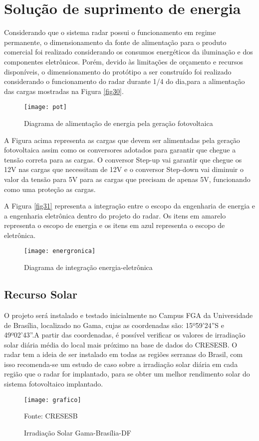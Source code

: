 

\chapter{Solução de suprimento de energia}
Considerando que o sistema radar possui o funcionamento em regime permanente, o dimensionamento da fonte de alimentação para o produto comercial foi realizado considerando os consumos energéticos da iluminação e dos componentes eletrônicos. Porém, devido às limitações de orçamento e recursos disponíveis, o dimensionamento do protótipo a ser construído foi realizado considerando o funcionamento do radar durante 1/4 do dia,para a alimentação das cargas mostradas na Figura \ref{fig30}.

\begin{figure}[h!]
\centering \label{fig30}
\texttt{[image: pot]}
\caption{Diagrama de alimentação de energia pela geração fotovoltaica }
\label{fig:circ}
\end{figure}

A Figura acima representa as cargas que devem ser alimentadas pela geração fotovoltaica assim como os conversores adotados para garantir que chegue a tensão correta para as cargas. O conversor Step-up vai garantir que chegue os 12V nas cargas que necessitam de 12V e o conversor Step-down vai diminuir o valor da tensão para 5V para as cargas que precisam de apenas 5V, funcionando como uma proteção as cargas.

A Figura \ref{fig31} representa a integração entre o escopo da engenharia de energia e a engenharia eletrônica dentro do projeto do radar. Os itens em amarelo representa o escopo de energia e os itens em azul representa o escopo de eletrônica.

\begin{figure}[h!]
\centering \label{fig31}
\texttt{[image: energronica]}
\caption{Diagrama de integração energia-eletrônica }
\label{fig:circ}
\end{figure}

\section{Recurso Solar}

O projeto será instalado e testado inicialmente no Campus FGA da Universidade de Brasília, localizado no Gama, cujas as coordenadas são: 15º59’24”S e 49º02’43”.A partir das coordenadas, é possível verificar os valores de irradiação solar diária média do local mais próximo na base de dados do CRESESB.
O radar tem a ideia de ser instalado em todas as regiões serranas do Brasil, com isso recomenda-se um estudo de caso sobre a irradiação solar diária em cada região que o radar for implantado, para se obter um melhor rendimento solar do sistema fotovoltaico implantado. 
\begin{figure}[h!]
\centering
\texttt{[image: grafico]}
\caption{Irradiação Solar Gama-Brasília-DF}
Fonte: CRESESB
\label{fig:grafico}
\end{figure}

